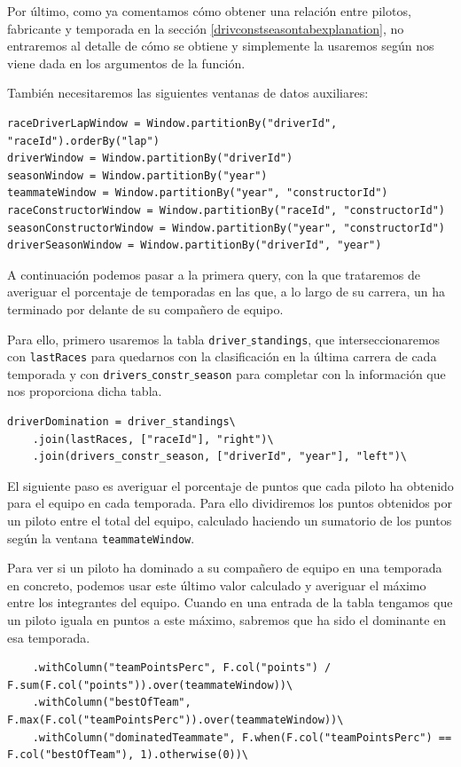 \documentclass[12pt,twoside,titlepage]{report}
\begin{document}
Por último, como ya comentamos cómo obtener una relación entre pilotos, fabricante y temporada en la sección  \ref{drivconstseasontabexplanation}, no entraremos al detalle de cómo se obtiene y simplemente la usaremos según nos viene dada en los argumentos de la función.

También necesitaremos las siguientes ventanas de datos auxiliares:

\begin{lstlisting}
raceDriverLapWindow = Window.partitionBy("driverId", "raceId").orderBy("lap")
driverWindow = Window.partitionBy("driverId")
seasonWindow = Window.partitionBy("year")
teammateWindow = Window.partitionBy("year", "constructorId")
raceConstructorWindow = Window.partitionBy("raceId", "constructorId")
seasonConstructorWindow = Window.partitionBy("year", "constructorId")
driverSeasonWindow = Window.partitionBy("driverId", "year")
\end{lstlisting}


A continuación podemos pasar a la primera query, con la que trataremos de averiguar el porcentaje de temporadas en las que, a lo largo de su carrera, un ha terminado por delante de su compañero de equipo.


Para ello, primero usaremos la tabla \texttt{driver$\_$standings}, que interseccionaremos con \texttt{lastRaces} para quedarnos con la clasificación en la última carrera de cada temporada y con \texttt{drivers$\_$constr$\_$season} para completar con la información que nos proporciona dicha tabla.

\begin{lstlisting}
driverDomination = driver_standings\
	.join(lastRaces, ["raceId"], "right")\
	.join(drivers_constr_season, ["driverId", "year"], "left")\
\end{lstlisting}

El siguiente paso es averiguar el porcentaje de puntos que cada piloto ha obtenido para el equipo en cada temporada. Para ello dividiremos los puntos obtenidos por un piloto entre el total del equipo, calculado haciendo un sumatorio de los puntos según la ventana \texttt{teammateWindow}.

Para ver si un piloto ha dominado a su compañero de equipo en una temporada en concreto, podemos usar este último valor calculado y averiguar el máximo entre los integrantes del equipo. Cuando en una entrada de la tabla tengamos que un piloto iguala en puntos a este máximo, sabremos que ha sido el dominante en esa temporada.

\begin{lstlisting}
	.withColumn("teamPointsPerc", F.col("points") / F.sum(F.col("points")).over(teammateWindow))\
	.withColumn("bestOfTeam", F.max(F.col("teamPointsPerc")).over(teammateWindow))\
	.withColumn("dominatedTeammate", F.when(F.col("teamPointsPerc") == F.col("bestOfTeam"), 1).otherwise(0))\
\end{lstlisting}
\end{document}
